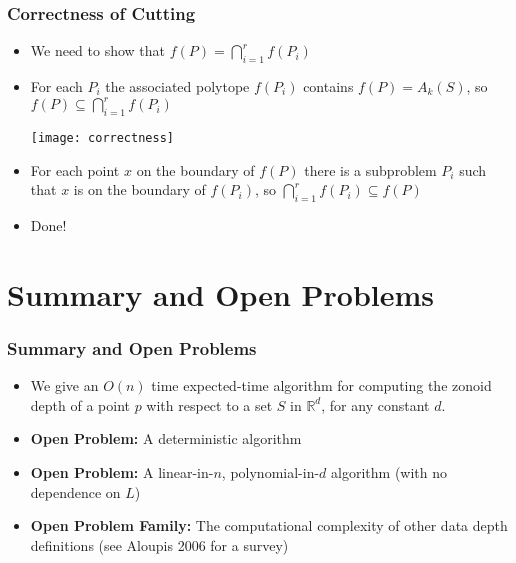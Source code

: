 \documentclass{beamer}
\begin{document}
\frame
{
   \frametitle{Correctness of Cutting}
   \begin{itemize}
     \item<1-> We need to show that $f(P)=\bigcap_{i=1}^r f(P_i)$
     \item<2-> For each $P_i$ the associated polytope $f(P_i)$ contains
          $f(P)=A_k(S)$,  so $f(P) \subseteq \bigcap_{i=1}^r f(P_i)$
          \begin{center}\texttt{[image: correctness]}\end{center}
     \item<3-> For each point $x$ on the boundary of $f(P)$ there is a
	subproblem $P_i$ such that $x$ is on the boundary of $f(P_i)$,
	so $\bigcap_{i=1}^r f(P_i)\subseteq f(P)$
     \item<4-> Done!
   \end{itemize}
}

\section{Summary and Open Problems}

\frame
{
   \frametitle{Summary and Open Problems}
   \begin{itemize}

     \item<1-> We give an $O(n)$ time expected-time algorithm for
computing the zonoid depth of a point $p$ with respect to a set $S$ in
$\mathbb{R}^d$, for any constant $d$.

     \item<2-> \textbf{Open Problem:} A deterministic algorithm
     \item<3-> \textbf{Open Problem:} A linear-in-$n$, polynomial-in-$d$
         algorithm (with no dependence on $L$)
     \item<4-> \textbf{Open Problem Family:} The computational complexity
	of other data depth definitions (see Aloupis 2006 for a survey)
   \end{itemize}
}
\end{document}
